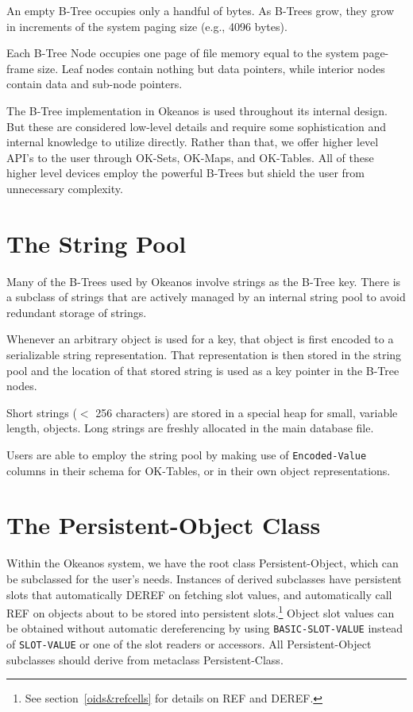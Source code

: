 \documentclass[article,oneside]{memoir}
\begin{document}
An empty B-Tree occupies only a handful of bytes. As B-Trees grow, they grow in increments of the system paging size (e.g., 4096 bytes).

Each B-Tree Node occupies one page of file memory equal to the system page-frame size. Leaf nodes contain nothing but data pointers, while interior nodes contain data and sub-node pointers.

The B-Tree implementation in Okeanos is used throughout its internal design. But these are considered low-level details and require some sophistication and internal knowledge to utilize directly. Rather than that, we offer higher level API's to the user through OK-Sets, OK-Maps, and OK-Tables. All of these higher level devices employ the powerful B-Trees but shield the user from unnecessary complexity.

\section{The String Pool}
Many of the B-Trees used by Okeanos involve strings as the B-Tree key. There is a subclass of strings that are actively managed by an internal string pool to avoid redundant storage of strings. 

Whenever an arbitrary object is used for a key, that object is first encoded to a serializable string representation. That representation is then stored in the string pool and the location of that stored string is used as a key pointer in the B-Tree nodes.

Short strings ($<$ 256 characters) are stored in a special heap for small, variable length, objects. Long strings are freshly allocated in the main database file.

Users are able to employ the string pool by making use of \texttt{Encoded-Value} columns in their schema for OK-Tables, or in their own object representations.

\section{The {\ttfamily Persistent-Object} Class}
Within the Okeanos system, we have the root class {\ttfamily Persistent-Object}, which can be subclassed for the user's needs. Instances of derived subclasses have persistent slots that automatically {\ttfamily DEREF} on fetching slot values, and automatically call {\ttfamily REF} on objects about to be stored into persistent slots.\footnote{See section~\ref{oids&refcells} for details on {\ttfamily REF} and {\ttfamily DEREF}.} Object slot values can be obtained without automatic dereferencing by using \texttt{BASIC-SLOT-VALUE} instead of \texttt{SLOT-VALUE} or one of the slot readers or accessors. All {\ttfamily Persistent-Object} subclasses should derive from metaclass {\ttfamily Persistent-Class}. 
\end{document}
